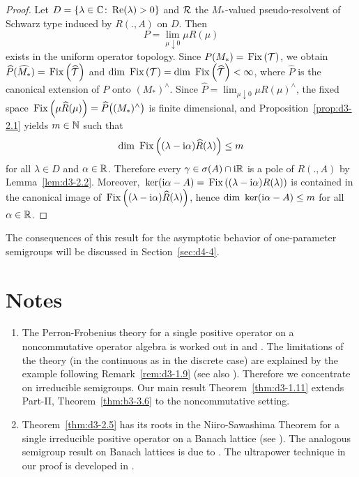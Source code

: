 \begin{proof}
Let $D = \{\lambda \in \mathbb{C} \colon \mathop{}\!\mathrm{Re}(\lambda) > 0\}$ and $\mathcal{R}$ the $M_{*}$-valued pseudo-resolvent of Schwarz type induced by $R(.,A)$ on $D$.
Then
\[
	P = \lim_{\mu \downarrow 0}\mu R(\mu)
\]
exists in the uniform operator topology.
Since $ P(M_{*}) = \mathop{}\mathrm{Fix}\left(\mathcal{T}\right) $, we obtain $ \widehat{P}(\widehat{M_{*}}) = \mathop{}\mathrm{Fix}\left(\widehat{\mathcal{T}}\right) $ and 
$\mathop{}\!\mathrm{dim}\, \mathop{}\mathrm{Fix}\left(\mathcal{T}\right) = \mathop{}\!\mathrm{dim}\, \mathop{}\mathrm{Fix}\left(\widehat{\mathcal{T}}\right) < \infty$, where $\widehat{P}$ is the canonical extension of\/ $P$ onto $(M_{*})^{\wedge}$.
Since $\widehat{P} = \lim_{\mu \downarrow 0} \mu R(\mu)^{\wedge}$, the fixed space $\mathop{}\mathrm{Fix}\left(\mu\widehat{R}(\mu)\right) = \widehat{P}\bigl((M_{*})^{\wedge}\bigr)$ is finite dimensional, and Proposition~\ref{prop:d3-2.1} yields $m \in \mathbb{N}$ such that
\[
\dim \Fix  {(\lambda - \im\alpha)\widehat{R}(\lambda)} \leq m
\]
for all $\lambda \in D$ and $\alpha \in \mathbb{R}$.
Therefore every $\gamma \in \sigma(A) \cap \mathrm{i}\mathbb{R}$ is a pole of\/ $R(.,A)$ by Lemma~\ref{lem:d3-2.2}.
Moreover, $\mathop{}\mathrm{ker}(\mathrm{i}\alpha - A) = \mathop{}\mathrm{Fix}\left((\lambda - \mathrm{i}\alpha)R(\lambda)\right)$ is contained in the canonical image of\/ $\mathop{}\mathrm{Fix}\left((\lambda - \mathrm{i}\alpha)\widehat{R}(\lambda)\right)$, hence $\dim \Kern{\im\alpha - A} \leq m$ for all $\alpha \in \mathbb{R}$.
\end{proof} 
The consequences of this result for the asymptotic behavior of one-parameter semigroups will be discussed in Section~\ref{sec:d4-4}.
\section*{Notes}\label{notes:d3-notes}
\begin{enumerate}[label=\emph{Section 3.\arabic*:}, wide, itemsep=1ex]

\item
The Perron-Frobenius theory for a single positive operator on a noncommutative operator algebra is worked out in \textcite{albeverio:1978} and \textcite{groh:1981}.
The limitations of the theory (in the continuous as in the discrete case)
are explained by the example following Remark~\ref{rem:d3-1.9} (see also \textcite{groh:1982a}). 
Therefore we concentrate on irreducible semigroups.
Our main result Theorem~\ref{thm:d3-1.11} extends Part-II, Theorem~\ref{thm:b3-3.6} to the noncommutative setting.

\item
Theorem~\ref{thm:d3-2.5} has its roots in the Niiro-Sawashima Theorem for a single irreducible positive operator on a Banach lattice (see \textcite[V.5.4]{schaefer:1974}).
The analogous semigroup result on Banach lattices is due to \textcite{greiner:1982}.
The ultrapower technique in our proof is developed in \textcite{groh:1984b}. 

\end{enumerate}
